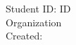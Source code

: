 \begin{titlepage}
    \centering
    \vspace*{5cm}
    {\LARGE{\textbf{\thetitle}}}\\
    \vspace*{2cm}
    \theauthor\\
    Student ID: ID\\   
    \vspace*{1cm}
    Organization\\   
    \vfill
    Created: \thedate   
\end{titlepage}